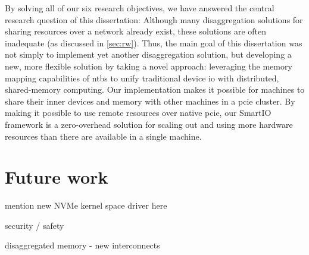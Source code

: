 By solving all of our six research objectives, we have answered the central research question of this dissertation:
\researchquestion*%
%
Although many \gls{disaggregation} solutions for sharing resources over a network already exist, these solutions are often inadequate (as discussed in \cref{sec:rw}). 
%
Thus, the main goal of this dissertation was not simply to implement yet another \gls{disaggregation} solution, but developing a new, more flexible solution by taking a novel approach:
leveraging the memory mapping capabilities of \glspl{ntb} to unify traditional device \gls{io} with distributed, shared-memory computing.
%
Our implementation makes it possible for machines to share their inner devices and memory with other machines in a \gls{pcie} cluster.
%
By making it possible to use remote resources over native \gls{pcie}, our SmartIO framework is a zero-overhead solution for scaling out and using more hardware resources than there are available in a single machine.



\section{Future work}\label{sec:fw}
%
%

mention new NVMe kernel space driver here

security / safety

disaggregated memory - new interconnects

